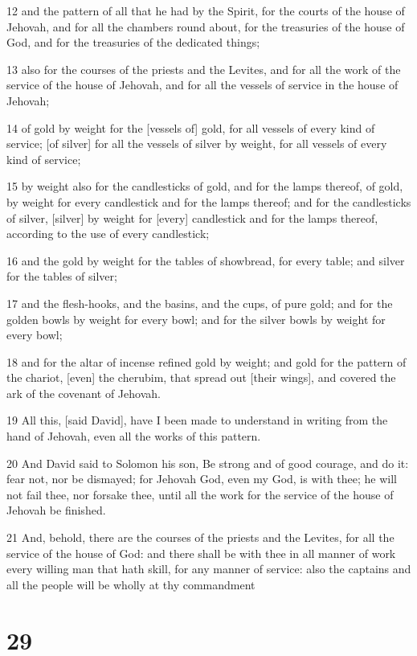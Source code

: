 \par 12 and the pattern of all that he had by the Spirit, for the courts of the house of Jehovah, and for all the chambers round about, for the treasuries of the house of God, and for the treasuries of the dedicated things;
\par 13 also for the courses of the priests and the Levites, and for all the work of the service of the house of Jehovah, and for all the vessels of service in the house of Jehovah;
\par 14 of gold by weight for the [vessels of] gold, for all vessels of every kind of service; [of silver] for all the vessels of silver by weight, for all vessels of every kind of service;
\par 15 by weight also for the candlesticks of gold, and for the lamps thereof, of gold, by weight for every candlestick and for the lamps thereof; and for the candlesticks of silver, [silver] by weight for [every] candlestick and for the lamps thereof, according to the use of every candlestick;
\par 16 and the gold by weight for the tables of showbread, for every table; and silver for the tables of silver;
\par 17 and the flesh-hooks, and the basins, and the cups, of pure gold; and for the golden bowls by weight for every bowl; and for the silver bowls by weight for every bowl;
\par 18 and for the altar of incense refined gold by weight; and gold for the pattern of the chariot, [even] the cherubim, that spread out [their wings], and covered the ark of the covenant of Jehovah.
\par 19 All this, [said David], have I been made to understand in writing from the hand of Jehovah, even all the works of this pattern.
\par 20 And David said to Solomon his son, Be strong and of good courage, and do it: fear not, nor be dismayed; for Jehovah God, even my God, is with thee; he will not fail thee, nor forsake thee, until all the work for the service of the house of Jehovah be finished.
\par 21 And, behold, there are the courses of the priests and the Levites, for all the service of the house of God: and there shall be with thee in all manner of work every willing man that hath skill, for any manner of service: also the captains and all the people will be wholly at thy commandment

\chapter{29}


